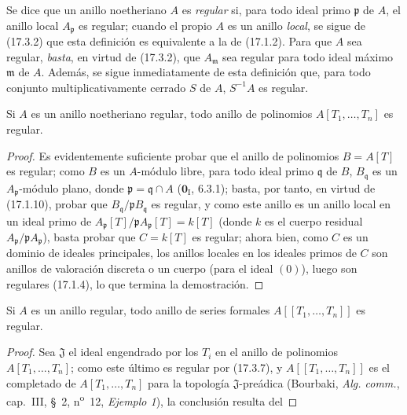 \begin{env}[17.3.6]
\label{0.17.3.6-fr}
Se dice que un anillo noetheriano $A$ es \emph{regular} si, para todo ideal
primo $\mathfrak{p}$ de $A$, el anillo local $A_{\mathfrak{p}}$ es regular;
cuando el propio $A$ es un anillo \emph{local}, se sigue de (17.3.2) que esta
definición es equivalente a la de (17.1.2). Para que $A$ sea regular, \emph{basta},
en virtud de (17.3.2), que $A_{\mathfrak{m}}$ sea regular para todo ideal
máximo $\mathfrak{m}$ de $A$. Además, se sigue inmediatamente de esta
definición que, para todo conjunto multiplicativamente cerrado $S$ de $A$,
$S^{-1}A$ es regular.
\end{env}

\begin{proposition}[17.3.7]
\label{0.17.3.7-fr}
Si $A$ es un anillo noetheriano regular, todo anillo de polinomios
$A[T_1,\ldots,T_n]$ es regular.
\end{proposition}

\begin{proof}
Es evidentemente suficiente probar que el anillo de polinomios $B=A[T]$ es
regular; como $B$ es un $A$-módulo libre, para todo ideal primo
$\mathfrak{q}$ de $B$, $B_{\mathfrak{q}}$ es un
$A_{\mathfrak{p}}$-módulo plano, donde $\mathfrak{p}=\mathfrak{q}\cap A$
($\mathbf{0}_{\mathrm I}$, 6.3.1); basta, por tanto, en virtud de (17.1.10), probar que
$B_{\mathfrak{q}}/\mathfrak{p}B_{\mathfrak{q}}$ es regular, y como este anillo
es un anillo local en un ideal primo de
$A_{\mathfrak{p}}[T]/\mathfrak{p}A_{\mathfrak{p}}[T]=k[T]$ (donde $k$ es el
cuerpo residual $A_{\mathfrak{p}}/\mathfrak{p}A_{\mathfrak{p}}$), basta
probar que $C=k[T]$ es regular; ahora bien, como $C$ es un dominio de ideales
principales, los anillos locales en los ideales primos de $C$ son anillos de
valoración discreta o un cuerpo (para el ideal $(0)$), luego son regulares
(17.1.4), lo que termina la demostración.
\end{proof}

\begin{corollary}[17.3.8]
\label{0.17.3.8-fr}
Si $A$ es un anillo regular, todo anillo de series formales
$A[[T_1,\ldots,T_n]]$ es regular.
\end{corollary}

\begin{proof}
Sea $\mathfrak{J}$ el ideal engendrado por los $T_i$ en el anillo de polinomios
$A[T_1,\ldots,T_n]$; como este último es regular por (17.3.7), y
$A[[T_1,\ldots,T_n]]$ es el completado de $A[T_1,\ldots,T_n]$ para la
topología $\mathfrak{J}$-preádica (Bourbaki, \emph{Alg. comm.}, cap.~III,
\S~2, n\textsuperscript{o}~12, \emph{Ejemplo 1}), la conclusión resulta del
\end{proof}

